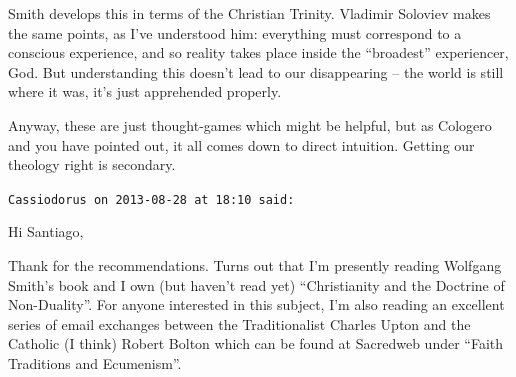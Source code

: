 \begin{footnotesize}
\begin{sffamily}
Smith develops this in terms of the Christian Trinity. Vladimir Soloviev makes the same points, as I've understood him: everything must correspond to a conscious experience, and so reality takes place inside the ``broadest'' experiencer, God. But understanding this doesn't lead to our disappearing -- the world is still where it was, it's just apprehended properly.

Anyway, these are just thought-games which might be helpful, but as Cologero and you have pointed out, it all comes down to direct intuition. Getting our theology right is secondary.

\hfill

\texttt{Cassiodorus on 2013-08-28 at 18:10 said:}

Hi Santiago,

Thank for the recommendations. Turns out that I'm presently reading Wolfgang Smith's book and I own (but haven't read yet) ``Christianity and the Doctrine of Non-Duality''. For anyone interested in this subject, I'm also reading an excellent series of email exchanges between the Traditionalist Charles Upton and the Catholic (I think) Robert Bolton which can be found at Sacredweb under ``Faith Traditions and Ecumenism''.


\hfill

\end{sffamily}
\end{footnotesize}

